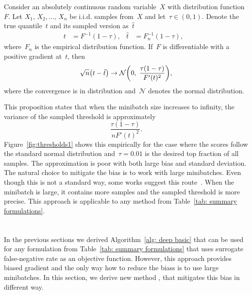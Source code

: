 \pagebreak

\begin{proposition}\label{proposition:bound}
  Consider an absolutely continuous random variable~$X$ with distribution function~$F.$ Let $X_1,\, X_2, \ldots, \, X_n$ be i.i.d. samples from~$X$ and let~$\tau \in (0,1).$ Denote the true quantile~$t$ and its sampled version as~$\hat{t}$
  \begin{align*}
    t & = F^{-1}(1 - \tau), &
    \hat{t} & = F_{n}^{-1}(1 - \tau), &
  \end{align*}
  where~$F_{n}$ is the empirical distribution function. If~$F$ is differentiable with a positive gradient at~$t$, then
  \begin{equation*}
    \sqrt{n}\Brac{t - \hat{t}} \rightarrow \mathcal{N} \Brac{0, \; \frac{\tau(1-\tau)}{F'(t)^2}},
  \end{equation*}
  where the convergence is in distribution and~$\mathcal{N}$ denotes the normal distribution.
\end{proposition}

This proposition states that when the minibatch size increases to infinity, the variance of the sampled threshold is approximately
\begin{equation*}
  \frac{\tau(1-\tau)}{nF'(t)^2}.
\end{equation*}
Figure~\ref{fig:thresholds1} shows this empirically for the case where the scores follow the standard normal distribution and~$\tau=0.01$ is the desired top fraction of all samples. The approximation is poor with both large bias and standard deviation. The natural choice to mitigate the bias is to work with large minibatches. Even though this is not a standard way, some works suggest this route~\cite{you2019large}. When the minibatch is large, it contains more samples and the sampled threshold is more precise. This approach is applicable to any method from Table~\ref{tab: summary formulations}.

\section{\DeepTopPush}

In the previous sections we derived Algorithm~\ref{alg: deep basic} that can be used for any formulation from Table~\ref{tab: summary formulations} that uses surrogate false-negative rate as an objective function. However, this approach provides biased gradient and the only way how to reduce the biass is to use large minibatches. In this section, we derive new method \DeepTopPush, that mitigates this bias in different way.

